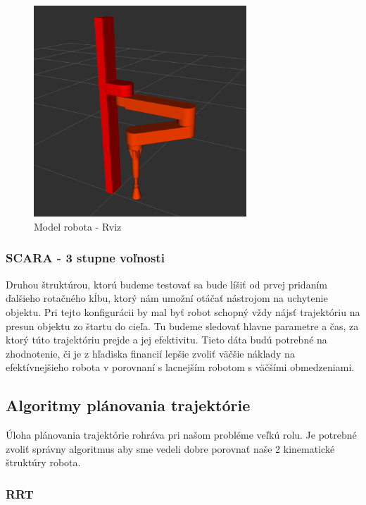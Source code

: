 \begin{figure}[h]
	\centering
	\includegraphics[width=80mm]{img/SCARA2.png}
	\caption{Model robota - Rviz}\label{OBRAZOK 1.1} 
\end{figure} 

\subsubsection{SCARA - 3 stupne voľnosti}
\label{kap:1.1.2}

Druhou štruktúrou, ktorú budeme testovať sa bude líšiť od prvej pridaním ďalšieho rotačného kĺbu, ktorý nám umožní otáčať nástrojom na uchytenie objektu. Pri tejto konfigurácii by mal byť robot schopný vždy nájsť trajektóriu na presun objektu zo štartu do cieľa. Tu budeme sledovať hlavne parametre a čas, za ktorý túto trajektóriu prejde a jej efektivitu. Tieto dáta budú potrebné na zhodnotenie, či je z hľadiska financií lepšie zvoliť väčšie náklady na efektívnejšieho robota v porovnaní s lacnejším robotom s väčšími obmedzeniami.

\subsection{Algoritmy plánovania trajektórie}
\label{kap:1.2}
Úloha plánovania trajektórie rohráva pri našom probléme veľkú rolu. Je potrebné zvoliť správny algoritmus aby sme vedeli dobre porovnať naše 2 kinematické štruktúry robota. 
\subsubsection{RRT}
\label{kap:1.2.1}

